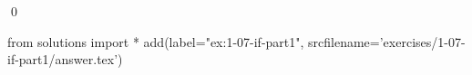 
\begin{ex}
  \label{ex:1-07-if-part1}
  
  \qed
\end{ex}
\begin{python0}
from solutions import *
add(label="ex:1-07-if-part1",
    srcfilename='exercises/1-07-if-part1/answer.tex')
\end{python0}
